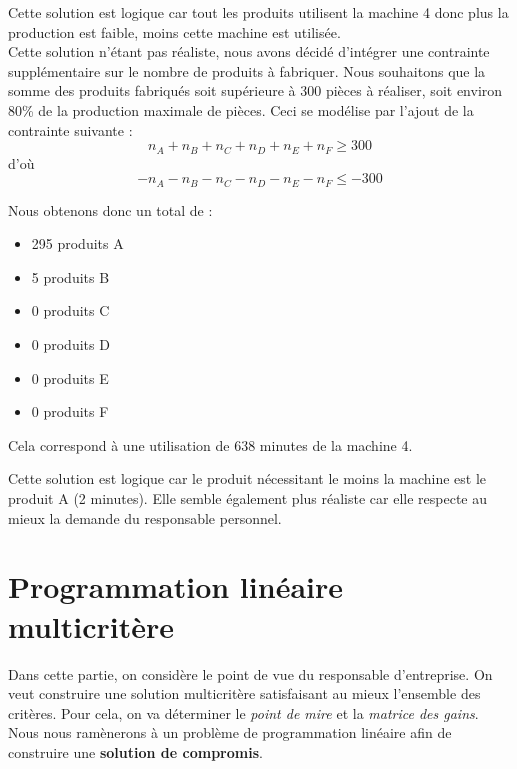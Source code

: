 \documentclass[a4paper,10pt]{article}
\begin{document}
Cette solution est logique car tout les produits utilisent la machine 4 donc plus la production est faible, moins cette machine est utilisée.\\

Cette solution n'étant pas réaliste, nous avons décidé d'intégrer une contrainte supplémentaire sur le nombre de produits à fabriquer. Nous souhaitons que la somme des produits fabriqués soit supérieure à 300 pièces à réaliser, soit environ 80\% de la production maximale de pièces.
Ceci se modélise par l'ajout de la contrainte suivante :\\

$$n_A + n_B + n_C + n_D + n_E + n_F \geq 300$$
d'où $$-n_A -n_B -n_C -n_D -n_E -n_F \leq -300$$

Nous obtenons donc un total de :\newline
\begin{itemize}
\item[\textbullet] 295 produits A
\item[\textbullet] 5 produits B
\item[\textbullet] 0 produits C
\item[\textbullet] 0 produits D
\item[\textbullet] 0 produits E
\item[\textbullet] 0 produits F\newline
\end{itemize}
Cela correspond à une utilisation de 638 minutes de la machine 4.\newline

Cette solution est logique car le produit nécessitant le moins la machine est le produit A (2 minutes). Elle semble également plus réaliste car elle respecte au mieux la demande du responsable personnel.


\newpage
\part{Programmation linéaire multicritère}

Dans cette partie, on considère le point de vue du responsable d'entreprise. On veut construire une solution multicritère satisfaisant au mieux l'ensemble des critères. Pour cela, on va déterminer le \emph{point de mire} et la \emph{matrice des gains}. Nous nous ramènerons à un problème de programmation linéaire afin de construire une \textbf{solution de compromis}.
\end{document}
